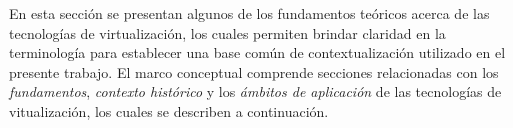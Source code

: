 En esta sección se presentan algunos de los fundamentos teóricos acerca de las tecnologías de virtualización, los cuales permiten brindar claridad en la terminología para establecer una base común de contextualización utilizado en el presente trabajo.  El marco conceptual comprende secciones relacionadas con los \textit{fundamentos}, \textit{contexto histórico} y los \textit{ámbitos de aplicación} de las tecnologías de vitualización, los cuales se describen a continuación.

\newpage


\newpage



\newpage



\newpage

